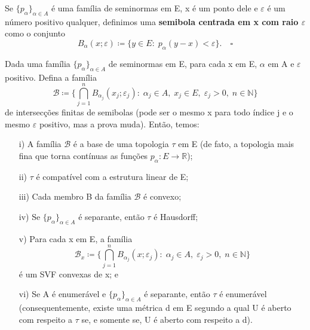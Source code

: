 \documentclass[../distribution_theory_notes.tex]{subfiles}
\begin{document}
\begin{def*}
  Se \(\{p_{\alpha }\}_{\alpha \in A}\) é uma família de seminormas em E, x é um ponto dele e \(\varepsilon \) é um número positivo qualquer, definimos uma \textbf{semibola centrada em x com raio \(\varepsilon \)} como o conjunto 
    \[
      B_{\alpha }(x; \varepsilon )\coloneqq \{y\in E:\; p_{\alpha }(y-x)<\varepsilon \}. \quad \square
    \]
\end{def*}
\begin{prop*}
  Dada uma família \(\{p_{\alpha }\}_{\alpha \in A}\) de seminormas em E, para cada x em E, \(\alpha \) em A e \(\varepsilon \) positivo. Defina a família 
    \[
    \mathcal{B}\coloneqq \biggl\{\bigcap_{j=1}^{n}B_{\alpha_{j}}(x_{j}; \varepsilon_{j}):\;\alpha_{j}\in A,\; x_{j}\in E,\; \varepsilon_{j}>0,\; n\in \mathbb{N}\biggr\}
    \]
    de intersecções finitas de semibolas (pode ser o mesmo x para todo índice j e o mesmo \(\varepsilon \) positivo, mas a prova muda). Então, temos: 
   \begin{itemize}
     \item[i)] A família \(\mathcal{B}\) é a base de uma topologia \(\tau \) em E (de fato, a topologia mais fina que torna contínuas as funções \(p_{\alpha }:E\rightarrow \mathbb{R}\));
       \item[ii)] \(\tau \) é compatível com a estrutura linear de E; 
         \item[iii)] Cada membro B da família \(\mathcal{B}\) é convexo; 
         \item[iv)] Se \(\{p_{\alpha }\}_{\alpha \in A}\) é separante, então \(\tau \) é Hausdorff;
           \item[v)] Para cada x em E, a família 
             \[
             \mathcal{B}_{x}\coloneqq \biggl\{\bigcap_{j=1}^{n}B_{\alpha_{j}}(x; \varepsilon_{j}):\; \alpha_{j}\in A,\; \varepsilon_{j}>0,\; n\in \mathbb{N}\biggr\}
             \]
             é um SVF convexas de x; e 
           \item[vi)] Se A é enumerável e \(\{p_{\alpha }\}_{\alpha \in A}\) é separante, então \(\tau \) é enumerável (consequentemente, existe uma métrica d em E segundo a qual U é aberto com respeito a \(\tau \) se, e somente se, U é aberto com respeito a d).
   \end{itemize}
\end{prop*}
\end{document}
